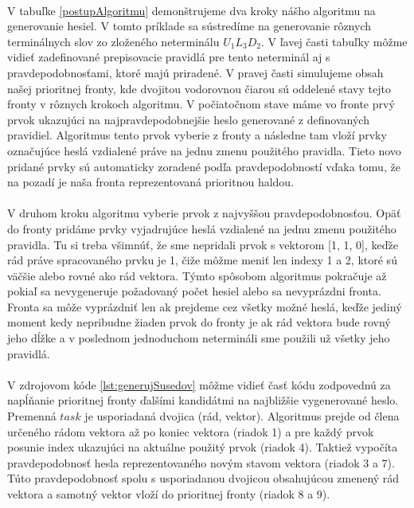 \paragraph{}
V tabuľke \ref{postupAlgoritmu} demonštrujeme dva kroky nášho algoritmu na generovanie hesiel. V tomto príklade sa sústredíme na generovanie rôznych terminálnych slov zo zloženého neterminálu \(U_1L_3D_2\). V ľavej časti tabuľky môžme vidieť zadefinované prepisovacie pravidlá pre tento neterminál aj s pravdepodobnosťami, ktoré majú priradené. V pravej časti simulujeme obsah našej prioritnej fronty, kde dvojitou vodorovnou čiarou sú oddelené stavy tejto fronty v rôznych krokoch algoritmu. V počiatočnom stave máme vo fronte prvý prvok ukazujúci na najpravdepodobnejšie heslo generované z definovaných pravidiel. Algoritmus tento prvok vyberie z fronty a následne tam vloží prvky označujúce heslá vzdialené práve na jednu zmenu použitého pravidla. Tieto novo pridané prvky sú automaticky zoradené podľa pravdepodobností vďaka tomu, že na pozadí je naša fronta reprezentovaná prioritnou haldou. 

\paragraph{}
V druhom kroku algoritmu vyberie prvok z najvyššou pravdepodobnosťou. Opäť do fronty pridáme prvky vyjadrujúce heslá vzdialené na jednu zmenu použitého pravidla. Tu si treba všimnúť, že sme nepridali prvok s vektorom [1, 1, 0], keďže rád práve spracovaného prvku je 1, čiže môžme meniť len indexy 1 a 2, ktoré sú väčšie alebo rovné ako rád vektora. Týmto spôsobom algoritmus pokračuje až pokiaľ sa nevygeneruje požadovaný počet hesiel alebo sa nevyprázdni fronta. Fronta sa môže vyprázdniť len ak prejdeme cez všetky možné heslá, keďže jediný moment kedy nepribudne žiaden prvok do fronty je ak rád vektora bude rovný jeho dĺžke a v poslednom jednoduchom netermináli sme použili už všetky jeho pravidlá.

\paragraph{}
V zdrojovom kóde \ref{lst:generujSusedov} môžme vidieť časť kódu zodpovednú za napĺňanie prioritnej fronty ďalšími kandidátmi na najbližšie vygenerované heslo. Premenná \(task\) je usporiadaná dvojica (rád, vektor). Algoritmus prejde od člena určeného rádom vektora až po koniec vektora (riadok 1) a pre každý prvok posunie index ukazujúci na aktuálne použitý prvok (riadok 4). Taktiež vypočíta pravdepodobnosť hesla reprezentovaného novým stavom vektora (riadok 3 a 7). Túto pravdepodobnosť spolu s usporiadanou dvojicou obsahujúcou zmenený rád vektora a samotný vektor vloží do prioritnej fronty (riadok 8 a 9).


